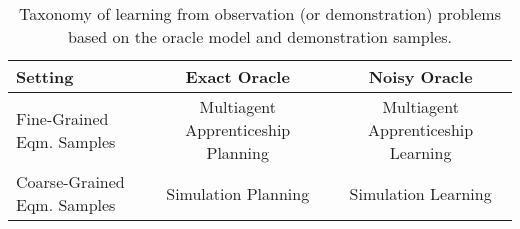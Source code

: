 \fi



\begin{table}[]
\renewcommand{\arraystretch}{2} 
\begin{tabular}{|l||c|c|}
\hline
Setting & Exact Oracle & Noisy Oracle \\
\hline \hline
Fine-Grained Eqm. Samples & Multiagent Apprenticeship Planning & Multiagent Apprenticeship Learning \\
\hline
Coarse-Grained Eqm. Samples & Simulation Planning & Simulation Learning \\
\hline
\end{tabular}
\caption{Taxonomy of learning from observation (or demonstration) problems based on the oracle model and demonstration samples.}
\end{table}
\fi

